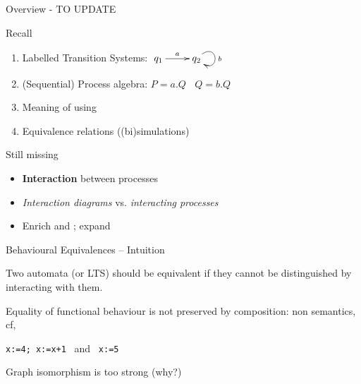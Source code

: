 \documentclass[aspectratio=169]{beamer}
\begin{document}
\frame[plain]{\titlepage}



\begin{slide}{Overview - TO UPDATE}

\begin{block}{Recall}
\begin{enumerate}
  \item Labelled Transition Systems:
    $\xymatrix{
      q_1 \ar[r]^{a}  & q_2 \ar@(ur,dr)[]^{b} 
    }$

  \item (Sequential) Process algebra:
    $P = a.Q ~~~~ Q=b.Q$

  \item Meaning of  using 

  \item Equivalence relations ((bi)simulations)
\end{enumerate}  
\end{block}

\begin{block}{Still missing}
\begin{itemize}
  \item \alert{\textbf{Interaction}} between processes
  \item \emph{Interaction \alert{diagrams}} vs. \emph{interacting \alert{processes}}
  \item Enrich  and ; expand 
\end{itemize}
\end{block}

\end{slide}



\begin{slide}{Behavioural Equivalences -- Intuition}
\small


Two automata (or LTS) should be \alert{equivalent} if they cannot be distinguished by interacting with them.


\begin{block}{Equality of functional behaviour}
is not preserved by  composition: non  semantics, cf,
\begin{center}
\texttt{x:=4; x:=x+1} ~and~ \texttt{x:=5}
\end{center}
\end{block}

\begin{block}{Graph isomorphism} 
is too strong (why?)
\end{block}

\end{slide}
\end{document}
